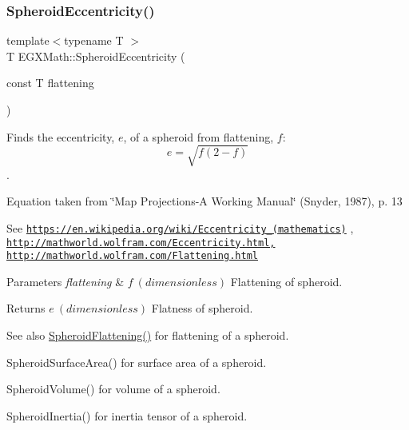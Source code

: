 \subsubsection{\texorpdfstring{Spheroid\+Eccentricity()}{SpheroidEccentricity()}\hspace{0.1cm}{\footnotesize\ttfamily [1/2]}}
{\footnotesize\ttfamily template$<$typename T $>$ \\
T E\+G\+X\+Math\+::\+Spheroid\+Eccentricity (\begin{DoxyParamCaption}\item[{const T}]{flattening }\end{DoxyParamCaption})}



Finds the eccentricity, $e$, of a spheroid from flattening, $f$\+: \[ e = \sqrt{f (2 - f)} \]. 

Equation taken from \char`\"{}\+Map Projections-\/\+A Working Manual\char`\"{} (Snyder, 1987), p. 13

See \href{https://en.wikipedia.org/wiki/Eccentricity_(mathematics)}{\tt https\+://en.\+wikipedia.\+org/wiki/\+Eccentricity\+\_\+(mathematics)} , \href{http://mathworld.wolfram.com/Eccentricity.html,}{\tt http\+://mathworld.\+wolfram.\+com/\+Eccentricity.\+html,} \href{http://mathworld.wolfram.com/Flattening.html}{\tt http\+://mathworld.\+wolfram.\+com/\+Flattening.\+html} 
\begin{DoxyParams}{Parameters}
{\em flattening} & $ f\ (dimensionless)$ Flattening of spheroid. \\
\hline
\end{DoxyParams}
\begin{DoxyReturn}{Returns}
$ e\ (dimensionless)$ Flatness of spheroid. 
\end{DoxyReturn}
\begin{DoxySeeAlso}{See also}
\mbox{\hyperlink{group___e_g_x_math-_geometry-3_d-_spheroid-_flattening_ga640f4bcd86aa4c378819bffda31c0852}{Spheroid\+Flattening()}} for flattening of a spheroid. 

Spheroid\+Surface\+Area() for surface area of a spheroid. 

Spheroid\+Volume() for volume of a spheroid. 

Spheroid\+Inertia() for inertia tensor of a spheroid. 
\end{DoxySeeAlso}
\mbox{\label{group___e_g_x_math-_geometry-3_d-_spheroid-_eccentricity_gab4c867532eef5a52e8e575e2a6b18bf8}} 

